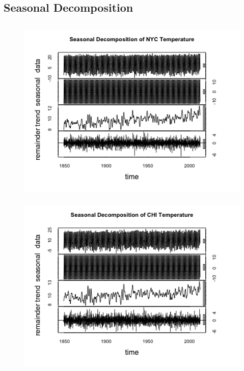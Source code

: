 \documentclass[12pt]{article}
\begin{document}
\subsection{Seasonal Decomposition}  \label{sec:sea}
\begin{figure}[H]
    \includegraphics[width=\textwidth, height=9cm]{Figures/nycSea.png}
    \includegraphics[width=\textwidth, height=9cm]{Figures/chiSea.png}
\end{figure}
\end{document}
